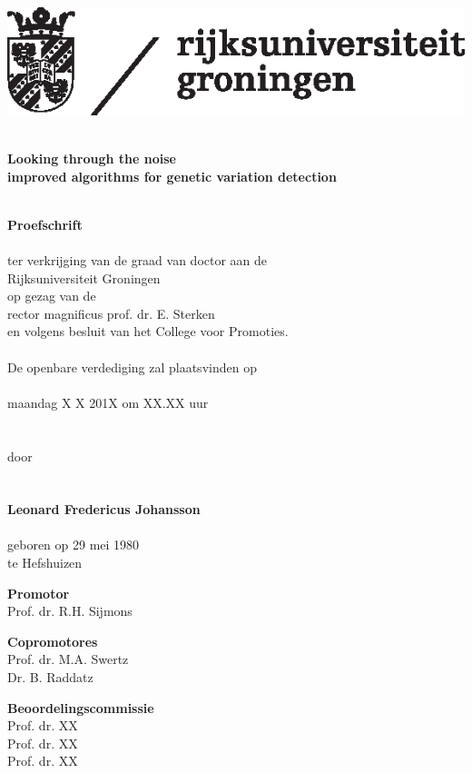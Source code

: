 \begin{flushleft}
\includegraphics[scale=0.8]{img/rugr_logonl_zwart_cmyk}
\end{flushleft}

\begin{center}
\linespread{1.00} %
~\\
\huge
\textbf{Looking through the noise \\ improved algorithms for genetic variation detection}
\\~\\
\linespread{1.05} %


\large
\textbf{Proefschrift}
\\~\\
\normalsize
ter verkrijging van de graad van doctor aan de\\
Rijksuniversiteit Groningen\\
op gezag van de\\
rector magnificus prof. dr. E. Sterken\\
en volgens besluit van het College voor Promoties.
\\~\\
De openbare verdediging zal plaatsvinden op
\\~\\
maandag X X 201X om XX.XX uur 
\\~\\~\\
door
\\~\\~\\
\large
\textbf{Leonard Fredericus Johansson}
\\~\\
\normalsize
geboren op 29 mei 1980\\
te Hefshuizen\\
\normalsize
\end{center}

\clearpage

\noindent
\textbf{Promotor}\\
Prof. dr. R.H. Sijmons

\noindent
\textbf{Copromotores}\\
Prof. dr. M.A. Swertz\\
Dr. B. Raddatz

\noindent
\textbf{Beoordelingscommissie}\\
Prof. dr. XX\\
Prof. dr. XX\\
Prof. dr. XX\\
